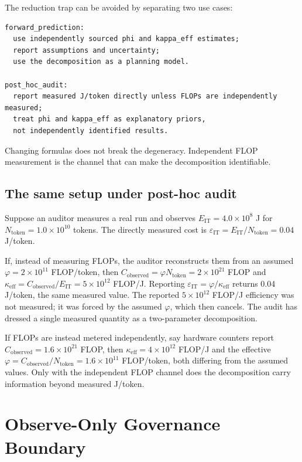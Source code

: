 \documentclass[11pt]{article}
\begin{document}
The reduction trap can be avoided by separating two use cases:

\begin{verbatim}
forward_prediction:
  use independently sourced phi and kappa_eff estimates;
  report assumptions and uncertainty;
  use the decomposition as a planning model.

post_hoc_audit:
  report measured J/token directly unless FLOPs are independently measured;
  treat phi and kappa_eff as explanatory priors,
  not independently identified results.
\end{verbatim}

Changing formulas does not break the degeneracy. Independent FLOP measurement is the channel that can make the decomposition identifiable.

\subsection{The same setup under post-hoc audit}

Suppose an auditor measures a real run and observes \(E_{\mathrm{IT}} = 4.0\times10^{8}\) J for \(N_{\mathrm{token}} = 1.0\times10^{10}\) tokens. The directly measured cost is \(\varepsilon_{\mathrm{IT}} = E_{\mathrm{IT}}/N_{\mathrm{token}} = 0.04\) J/token.

If, instead of measuring FLOPs, the auditor reconstructs them from an assumed \(\varphi = 2\times10^{11}\) FLOP/token, then \(C_{\mathrm{observed}} = \varphi N_{\mathrm{token}} = 2\times10^{21}\) FLOP and \(\kappa_{\mathrm{eff}} = C_{\mathrm{observed}}/E_{\mathrm{IT}} = 5\times10^{12}\) FLOP/J. Reporting \(\varepsilon_{\mathrm{IT}} = \varphi/\kappa_{\mathrm{eff}}\) returns 0.04 J/token, the same measured value. The reported \(5\times10^{12}\) FLOP/J efficiency was not measured; it was forced by the assumed \(\varphi\), which then cancels. The audit has dressed a single measured quantity as a two-parameter decomposition.

If FLOPs are instead metered independently, say hardware counters report \(C_{\mathrm{observed}} = 1.6\times10^{21}\) FLOP, then \(\kappa_{\mathrm{eff}} = 4\times10^{12}\) FLOP/J and the effective \(\varphi = C_{\mathrm{observed}}/N_{\mathrm{token}} = 1.6\times10^{11}\) FLOP/token, both differing from the assumed values. Only with the independent FLOP channel does the decomposition carry information beyond measured J/token.

\section{Observe-Only Governance Boundary}
\end{document}
